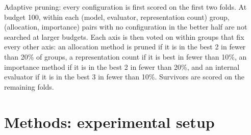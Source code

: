 Adaptive pruning: every configuration is first scored on the first two folds. At budget 100, within each (model, evaluator, representation count) group, (allocation, importance) pairs with no configuration in the better half are not searched at larger budgets. Each axis is then voted on within groups that fix every other axis: an allocation method is pruned if it is in the best 2 in fewer than 20\% of groups, a representation count if it is best in fewer than 10\%, an importance method if it is in the best 2 in fewer than 20\%, and an internal evaluator if it is in the best 3 in fewer than 10\%. Survivors are scored on the remaining folds.

\section{Methods: experimental setup}
